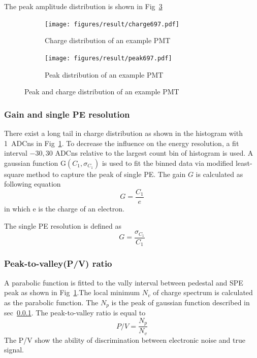 The peak amplitude distribution is shown in Fig~\ref{fig:peak}
\begin{figure}[!htbp]
    \centering
    \begin{subfigure}[t]{0.45\textwidth}
        \texttt{[image: figures/result/charge697.pdf]}
        \caption{Charge distribution of an example PMT}%
        \label{fig:charge}
    \end{subfigure}
    \begin{subfigure}[t]{0.45\textwidth}
        \texttt{[image: figures/result/peak697.pdf]}
        \caption{Peak distribution of an example PMT}%
        \label{fig:peak}
    \end{subfigure}
    \caption{Peak and charge distribution of an example PMT}
\end{figure}
\subsubsection{Gain and single PE resolution}
\label{sec:noisegain}
There exist a long tail in charge distribution as shown in the histogram with \SI{1}{ADCns} in Fig~\ref{fig:charge}. To decrease the influence on the energy resolution, a fit interval $-30, 30$ ADCns relative to the largest count bin of histogram is used. A gaussian function G$(C_1,\sigma_{C_1})$ is used to fit the binned data via modified least-square method to capture the peak of single PE. The gain $G$ is calculated as following equation
\begin{equation}
    G=\frac{C_1}{e}
\end{equation}
in which e is the charge of an electron.

The single PE resolution is defined as
\begin{equation}
    G=\frac{\sigma_{C_1}}{C_1}
\end{equation}
\subsubsection{Peak-to-valley(P/V) ratio}
A parabolic function is fitted to the vally interval between pedestal and SPE peak as shown in Fig~\ref{fig:charge}.The local minimum $N_v$ of charge spectrum is calculated as the parabolic function. The $N_p$ is the peak of gaussian function described in sec~\ref{sec:noisegain}. The peak-to-valley ratio is equal to  
\begin{equation}
    P/V=\frac{N_p}{N_v}
\end{equation}
The P/V show the ability of discrimination between electronic noise and true signal.
